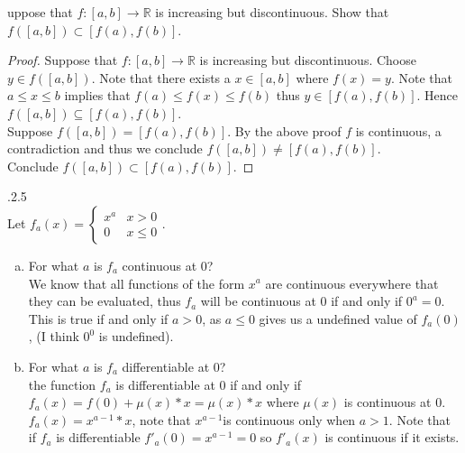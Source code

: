 \documentclass[12pt]{article}
\makeatletter
\theoremstyle{homework}
\newenvironment{exercise}[1]
{\def\@currentlabel{#1}\exercisecore}
{\endexercisecore}
\makeatother
\begin{document}
\begin{exercise}

Suppose that $f : [a, b] \rightarrow \mathbb{R}$ is increasing but discontinuous. Show that $f ([a, b]) \subset [f (a), f (b)]$.\\
\end{exercise}
\begin{proof}
Suppose that $f : [a, b] \rightarrow \mathbb{R}$ is increasing but discontinuous.  Choose $y\in f ([a, b])$.  Note that there exists a $x\in[a,b]$ where $f(x)=y$.  Note that $a\leq x\leq b$ implies that $f(a)\leq f(x)\leq f(b)$ thus $y\in [f(a),f(b)]$.  Hence $f ([a, b]) \subseteq [f (a), f (b)]$.\\
Suppose $f ([a, b]) = [f (a), f (b)]$.  By the above proof $f$ is continuous, a contradiction and thus we conclude $f ([a, b]) \neq [f (a), f (b)]$.\\
Conclude $f ([a, b]) \subset [f (a), f (b)]$.
\end{proof}


\begin{exercise}

5.2.5\\
Let $f_a(x)=\begin{cases}
x^a&x>0\\
0&x\leq 0
\end{cases}$.
\end{exercise}
\begin{enumerate}[(a)]
\item
For what $a$ is $f_a$ continuous at 0?\\
We know that all functions of the form $x^a$ are continuous everywhere that they can be evaluated, thus $f_a$ will be continuous at 0 if and only if $0^a=0$.  This is true if and only if $a>0$, as $a\leq 0$ gives us a undefined value of $f_a(0)$, (I think $0^0$ is undefined).
\item
For what $a$ is $f_a$ differentiable at 0?\\
the function $f_a$ is differentiable at 0 if and only if $f_a(x)=f(0)+\mu(x)*x=\mu(x)*x$ where $\mu(x)$ is continuous at $0$.  $f_a(x)=x^{a-1}*x$, note that $x^{a-1}$is continuous only when $a>1$.  Note that if $f_a$ is differentiable $f'_a(0)=x^{a-1}=0$ so $f'_a(x)$ is continuous if it exists.
\end{enumerate}
\end{document}
